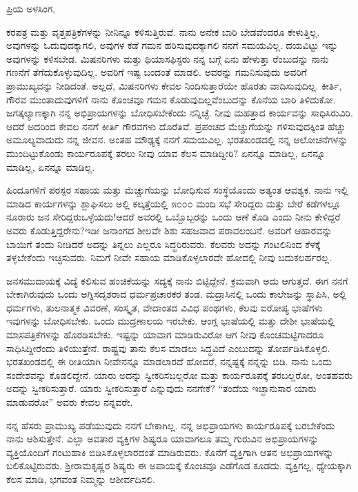 \noindent
ಪ್ರಿಯ ಅಳಸಿಂಗ,

ಕರಪತ್ರ ಮತ್ತು ವೃತ್ತಪತ್ರಿಕೆಗಳನ್ನು ನೀನಿನ್ನೂ ಕಳಿಸುತ್ತಿರುವೆ. ನಾನು ಅನೇಕ ಬಾರಿ ಬೇಡವೆಂದರೂ ಕೇಳುತ್ತಿಲ್ಲ. ಅವುಗಳನ್ನು ಓದುವುದಕ್ಕಾಗಲಿ, ಅವುಗಳ ಕಡೆ ಗಮನ ಹರಿಸುವುದಕ್ಕಾಗಲಿ ನನಗೆ ಸಮಯವಿಲ್ಲ. ದಯವಿಟ್ಟು ಇನ್ನು ಅವುಗಳನ್ನು ಕಳಿಸಬೇಡ. ಮಿಷನರಿಗಳು ಮತ್ತು ಥಿಯಾಸಫಿಸ್ಟರು ನನ್ನ ಬಗ್ಗೆ ಏನು ಹೇಳುತ್ತಾ ರೆಂಬುದನ್ನು ನಾನು ಗಣನೆಗೆ ತೆಗೆದುಕೊಳ್ಳುವುದಿಲ್ಲ. ಅವರಿಗೆ ಇಷ್ಟ ಬಂದಂತೆ ಮಾಡಲಿ. ಅವರನ್ನು ಗಮನಿಸುವುದು ಅವರಿಗೆ ಪ್ರಾಮುಖ್ಯವನ್ನು ನೀಡಿದಂತೆ. ಅಲ್ಲದೆ, ಮಿಷನರಿಗಳು ಕೇವಲ ನಿಂದಿಸುತ್ತಾರೆಯೇ ಹೊರತು ವಾದಿಸುವುದಿಲ್ಲ. ಕೀರ್ತಿ, ಗೌರವ ಮುಂತಾದುವುಗಳಿಗೆ ನಾನು ಕೊಂಚವೂ ಗಮನ ಕೊಡುವುದಿಲ್ಲವೆಂಬುದನ್ನು ಕೊನೆಯ ಬಾರಿ ತಿಳಿದುಕೋ. ಜಗತ್ಕಲ್ಯಾಣಕ್ಕಾಗಿ ನನ್ನ ಅಭಿಪ್ರಾಯಗಳನ್ನು ಬೋಧಿಸಬೇಕೆಂದು ನನ್ನಿಚ್ಛೆ. ನೀವು ಮಹತ್ತಾದ ಕಾರ್ಯವನ್ನು ಸಾಧಿಸಿರುವಿರಿ. ಆದರೆ ಅದರಿಂದ ಕೇವಲ ನನಗೆ ಕೀರ್ತಿ ಗೌರವಗಳು ದೊರೆತಿವೆ. ಪ್ರಪಂಚದ ಮೆಚ್ಚುಗೆಯನ್ನು ಗಳಿಸುವುದಕ್ಕಿಂತ ಹೆಚ್ಚು ಅಮೂಲ್ಯವಾದುದು ನನ್ನ ಜೀವನ. ಅಂತಹ ಮೌಢ್ಯಕ್ಕೆ ನನಗೆ ಸಮಯವಿಲ್ಲ. ಭರತಖಂಡದಲ್ಲಿ ನನ್ನ ಆಲೋಚನೆಗಳನ್ನು ಮುಂದಿಟ್ಟುಕೊಂಡು ಕಾರ್ಯರೂಪಕ್ಕೆ ತರಲು ನೀವು ಯಾವ ಕೆಲಸ ಮಾಡಿದ್ದೀರಿ? ಏನನ್ನೂ ಮಾಡಿಲ್ಲ, ಏನನ್ನೂ ಮಾಡಿಲ್ಲ, ಏನನ್ನೂ ಮಾಡಿಲ್ಲ.

ಹಿಂದೂಗಳಿಗೆ ಪರಸ್ಪರ ಸಹಾಯ ಮತ್ತು ಮೆಚ್ಚುಗೆಯನ್ನು ಬೋಧಿಸುವ ಸಂಸ್ಥೆಯೊಂದು ಅತ್ಯಂತ ಆವಶ್ಯಕ. ನಾನು ಇಲ್ಲಿ ಮಾಡಿದ ಕಾರ್ಯಗಳನ್ನು ಶ್ಲಾಘಿಸಲು ಅಲ್ಲಿ ಕಲ್ಕತ್ತೆಯಲ್ಲಿ ೫೦೦೦ ಮಂದಿ ಸಭೆ ಸೇರಿದ್ದರು ಮತ್ತು ಬೇರೆ ಕಡೆಗಳಲ್ಲೂ ನೂರಾರು ಜನ ಸೇರಿದ್ದರು\enginline{-}ಒಳ್ಳೆಯದು!ಆದರೆ ಅವರಲ್ಲಿ ಒಬ್ಬೊಬ್ಬರನ್ನು ಒಂದು ಆಣೆ ಕೊಡಿ ಎಂದು ನೀನು ಕೇಳಿದ್ದರೆ ಅವರು ಕೊಡುತ್ತಿದ್ದರೇನು?ಇಡೀ ಜನಾಂಗದ ಶೀಲವೇ ಶಿಶು ಸಹಜವಾದ ಪರಾವಲಂಬನೆ. ಅವರಿಗೆ ಆಹಾರವನ್ನು ಬಾಯಿಗೆ ತಂದು ನೀಡಿದರೆ ಅದನ್ನು ತಿನ್ನಲು ಎಲ್ಲರೂ ಸಿದ್ಧರಿರುವರು. ಕೆಲವರು ಅದನ್ನು ಗಂಟಲಿನಿಂದ ಕೆಳಕ್ಕೆ ತಳ್ಳಬೇಕೆಂದು ಇಚ್ಛಿಸುವರು. ನಿಮಗೆ ನೀವೇ ಸಹಾಯ ಮಾಡಿಕೊಳ್ಳಲಾರದೇ ಹೋದಲ್ಲಿ ನೀವು ಬದುಕಲರ್ಹರಲ್ಲ.

ಜನಸಮುದಾಯಕ್ಕೆ ವಿದ್ಯೆ ಕಲಿಸುವ ಹಂಚಿಕೆಯನ್ನು ಸದ್ಯಕ್ಕೆ ನಾನು ಬಿಟ್ಟಿದ್ದೇನೆ. ಕ್ರಮವಾಗಿ ಅದು ಆಗುತ್ತದೆ. ಈಗ ನನಗೆ ಬೇಕಾಗಿರುವುದು ಒಂದು ಅಗ್ನಿಸದೃಶರಾದ ಧರ್ಮಪ್ರಚಾರಕರ ತಂಡ. ಮದ್ರಾಸಿನಲ್ಲಿ ಒಂದು ಕಾಲೇಜನ್ನು ಸ್ಥಾಪಿಸಿ, ಅಲ್ಲಿ ಧರ್ಮಗಳು, ತುಲನಾತ್ಮಕ ವಿವರಣೆ, ಸಂಸ್ಕೃತ, ವೇದಾಂತದ ವಿವಿಧ ಪಂಥಗಳು, ಕೆಲವು ಐರೋಪ್ಯ ಭಾಷೆಗಳು ಇವುಗಳನ್ನು ಬೋಧಿಸಬೇಕು. ಒಂದು ಮುದ್ರಣಾಲಯ ಇರಬೇಕು. ಆಂಗ್ಲ ಭಾಷೆಯಲ್ಲಿ ಮತ್ತು ದೇಶೀ ಭಾಷೆಯಲ್ಲಿ ಮಾಸಪತ್ರಿಕೆಗಳನ್ನು ಹೊರಡಿಸಬೇಕು. ಇಷ್ಟನ್ನು ಯಾವಾಗ ಮಾಡಿರುವಿರೋ ಆಗ ನೀವು ಕೊಂಚಮಟ್ಟಿಗಾದರೂ ಸಾಧಿಸಿದ್ದೀರೆಂದು ತಿಳಿಯುತ್ತೇನೆ. ರಾಷ್ಟ್ರವು ತಾನು ಕೆಲಸ ಮಾಡಲು ಸಿದ್ಧವಿದೆ ಎಂಬುದನ್ನು ತೋರ್ಪಡಿಸಿಕೊಳ್ಳಲಿ. ಭರತಖಂಡದಲ್ಲಿ ಈ ರೀತಿಯಾಗಿ ನೀವೇನನ್ನೂ ಮಾಡಲಾರದೆ ಹೋದರೆ, ನನ್ನಷ್ಟಕ್ಕೆ ನನ್ನನ್ನು ಬಿಡಿ. ನಾನು ಒಂದು ಸಂದೇಶವನ್ನು ಕೊಡಲಿದ್ದೇನೆ. ಯಾರು ಅದನ್ನು ಸ್ವೀಕರಿಸಬಲ್ಲರೋ ಮತ್ತು ಕಾರ್ಯರೂಪಕ್ಕೆ ತರಬಲ್ಲರೋ, ಅಂತಹವರು ಅದನ್ನು ಸ್ವೀಕರಿಸುತ್ತಾರೆ. ಯಾರು ಸ್ವೀಕರಿಸುತ್ತಾರೆ ಎನ್ನುವುದು ನನಗೇಕೆ? ``ತಂದೆಯ ಇಚ್ಛಾನುಸಾರ ಯಾರು ಮಾಡುವರೋ'' ಅವರು ಕೇವಲ ನನ್ನವರೇ.

ನನ್ನ ಹೆಸರು ಪ್ರಾಮುಖ್ಯ ಪಡೆಯುವುದು ನನಗೆ ಬೇಕಾಗಿಲ್ಲ. ನನ್ನ ಅಭಿಪ್ರಾಯಗಳು ಕಾರ್ಯರೂಪಕ್ಕೆ ಬರಬೇಕೆಂದು ನಾನು ಆಶಿಸುತ್ತೇನೆ. ಎಲ್ಲಾ ಅವತಾರ ವ್ಯಕ್ತಿಗಳ ಶಿಷ್ಯರೂ ಯಾವಾಗಲೂ ತಮ್ಮ ಗುರುವಿನ ಅಭಿಪ್ರಾಯಗಳನ್ನು ವ್ಯಕ್ತಿಯೊಂದಿಗೆ ಗಂಟುಹಾಕಿ ಬಿಡಿಸಿಕೊಳ್ಳಲಾರದಂತೆ ಮಾಡಿರುವರು. ಕೊನೆಗೆ ವ್ಯಕ್ತಿಗಾಗಿ ಆತನ ಅಭಿಪ್ರಾಯಗಳನ್ನು ಬಲಿಕೊಟ್ಟಿರುವರು. ಶ‍್ರೀರಾಮಕೃಷ್ಣರ ಶಿಷ್ಯರು ಈ ಅಪಾಯಕ್ಕೆ ಕೊಂಚವೂ ಎಡೆಗೊಡ ಕೂಡದು. ವ್ಯಕ್ತಿಗಲ್ಲ, ಧ್ಯೇಯಕ್ಕಾಗಿ ಕೆಲಸ ಮಾಡಿ, ಭಗವಂತ ನಿಮ್ಮನ್ನು ಆಶೀರ್ವದಿಸಲಿ.

